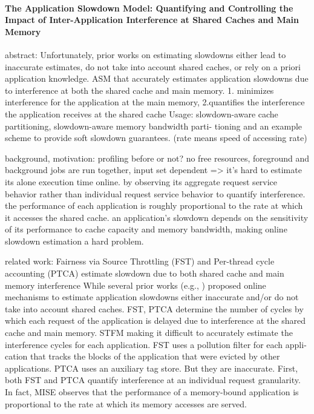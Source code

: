 \documentclass[8pt,UTF8]{article}
\begin{document}
            \paragraph{The Application Slowdown Model: Quantifying and Controlling the Impact of Inter-Application Interference at Shared Caches and Main Memory}
                abstract: Unfortunately, prior works on estimating slowdowns either lead to inaccurate estimates, do not take into account shared caches, or rely on a priori application knowledge. ASM that accurately estimates application slowdowns due to interference at both the shared cache and main memory.  1. minimizes interference for the application at the main memory, 2.quantifies the interference the application receives at the shared cache Usage: slowdown-aware cache partitioning, slowdown-aware memory bandwidth parti- tioning and an example scheme to provide soft slowdown guarantees. (rate means speed of accessing rate)
                
                background, motivation: profiling before or not?  no free resources, foreground and background jobs are run together, input set dependent => it's hard to estimate its alone execution time online.   by observing its aggregate request service behavior rather than individual request service behavior to quantify interference.  the performance of each application is roughly proportional to the rate at which it accesses the shared cache.   an application’s slowdown depends on the sensitivity of its performance to cache capacity and memory bandwidth, making online slowdown estimation a hard problem.  
                
                related work: Fairness via Source Throttling (FST) \cite{ebrahimi2010fairness}  and Per-thread cycle accounting (PTCA) \cite{du2013per} estimate slowdown due to both shared cache and main memory interference While several prior works (e.g., \cite{ebrahimi2010fairness,du2013per, mutlu2007stall,subramanian2013mise}) proposed online mechanisms to estimate application slowdowns either inaccurate and/or do not take into account shared caches. FST, PTCA determine the number of cycles by which each request of the application is delayed due to interference at the shared cache and main memory.   STFM \cite{mutlu2007stall} making it difficult to accurately estimate the interference cycles for each application. FST uses a pollution filter for each appli- cation that tracks the blocks of the application that were evicted by other applications. PTCA uses an auxiliary tag store. But they are inaccurate. First, both FST and PTCA quantify interference at an individual request granularity.  In fact, MISE \cite{subramanian2013mise} observes that the performance of a memory-bound application is proportional to the rate at which its memory accesses are served.
                
\end{document}
